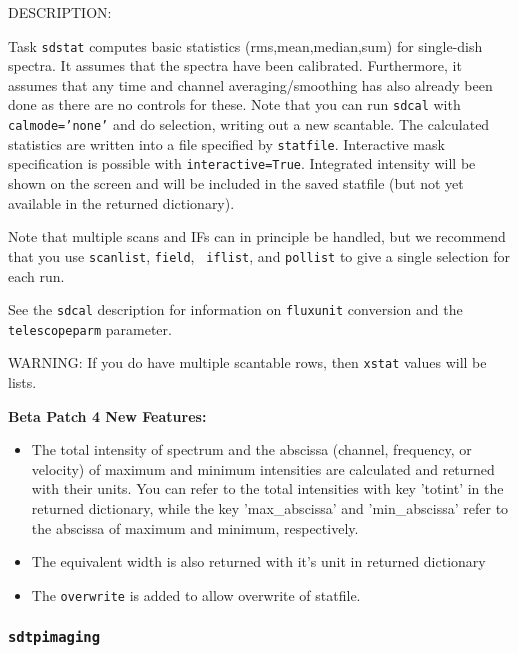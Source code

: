     DESCRIPTION: 

     Task {\tt sdstat} computes basic statistics (rms,mean,median,sum)
     for single-dish spectra.  It assumes that the spectra have
     been calibrated.  Furthermore, it assumes that any
     time and channel averaging/smoothing has also already been done as
     there are no controls for these. Note that you can run {\tt sdcal}
     with {\tt calmode='none'} and do selection, writing out a new
     scantable.
     The calculated statistics are written into a file specified by
     {\tt statfile}.
     Interactive mask specification is possible with {\tt interactive=True}.
     Integrated intensity will be shown on the screen and will be included
     in the saved statfile (but not yet available in the returned dictionary).

     Note that multiple scans and IFs can in principle be handled, but
     we recommend that you use {\tt scanlist}, {\tt field}, {\tt
     iflist}, and {\tt pollist} to give a single selection for each run.

     See the {\tt sdcal} description for information on {\tt fluxunit} 
     conversion and the {\tt telescopeparm} parameter.

     WARNING: If you do have multiple scantable rows, then {\tt xstat}
     values will be lists.

     {\bf Beta Patch 4 New Features:} 
     \begin{itemize}
     \item The total intensity of spectrum and the abscissa (channel,
     frequency, or velocity) of maximum and minimum intensities are
     calculated and returned with their units. You can refer to the
     total intensities with key 'totint' in the returned dictionary,
     while the key 'max\_abscissa' and 'min\_abscissa' refer to the
     abscissa of maximum and minimum, respectively. 
     \item The equivalent width is also returned with it's unit in
     returned dictionary
     \item The {\tt overwrite} is added to allow 
     overwrite of  statfile.
     \end{itemize}


\subsubsection{{\tt sdtpimaging}}
\label{section:sd.sdtasks.tasks.sdtpimaging}


